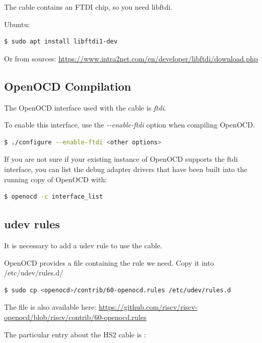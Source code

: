 \documentclass{article}
\begin{document}
    The cable contains an FTDI chip, so you need libftdi.
    
    Ubuntu:
    
    \begin{lstlisting}[language=bash]
    $ sudo apt install libftdi1-dev
    \end{lstlisting}
    
    Or from sources: \url{https://www.intra2net.com/en/developer/libftdi/download.php}
    
    \subsection{OpenOCD Compilation}
    
    The OpenOCD interface used with the cable is \textit{ftdi}.
    
    To enable this interface, use the \textit{-{}-enable-ftdi} option when compiling OpenOCD.
    
    \begin{lstlisting}[language=bash]
    $ ./configure --enable-ftdi <other options>
    \end{lstlisting}
    
    If you are not sure if your existing instance of OpenOCD supports the ftdi interface, you can list the debug adapter drivers that have been built into the running copy of OpenOCD with:
    
    \begin{lstlisting}[language=bash]
    $ openocd -c interface_list
    \end{lstlisting}
    
    \subsection{udev rules}
    
    It is necessary to add a udev rule to use the cable.
    
    OpenOCD provides a file containing the rule we need. Copy it into /etc/udev/rules.d/
    
    \begin{lstlisting}[language=bash]
    $ sudo cp <openocd>/contrib/60-openocd.rules /etc/udev/rules.d
    \end{lstlisting}
    
    The file is also available here: \url{https://github.com/riscv/riscv-openocd/blob/riscv/contrib/60-openocd.rules}
    
    The particular entry about the HS2 cable is :
    
\end{document}
